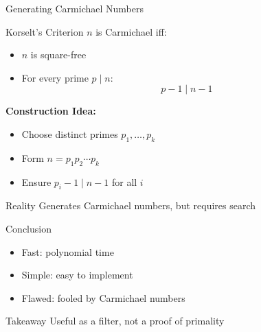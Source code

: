 \documentclass{beamer}
\begin{document}
\begin{frame}{Generating Carmichael Numbers}

\begin{block}{Korselt's Criterion}
$n$ is Carmichael iff:
\begin{itemize}
    \item $n$ is square-free
    \item For every prime $p \mid n$:
    \[
    p - 1 \mid n - 1
    \]
\end{itemize}
\end{block}

\vspace{1em}

\textbf{Construction Idea:}
\begin{itemize}
    \item Choose distinct primes $p_1, \dots, p_k$
    \item Form $n = p_1 p_2 \cdots p_k$
    \item Ensure $p_i - 1 \mid n - 1$ for all $i$
\end{itemize}

\vspace{1em}

\begin{block}{Reality}
Generates Carmichael numbers, but requires search
\end{block}

\end{frame}

\begin{frame}{Conclusion}

\begin{itemize}
    \item Fast: polynomial time
    \item Simple: easy to implement
    \item Flawed: fooled by Carmichael numbers
\end{itemize}

\vspace{1em}

\begin{block}{Takeaway}
Useful as a filter, not a proof of primality
\end{block}

\end{frame}
\end{document}
